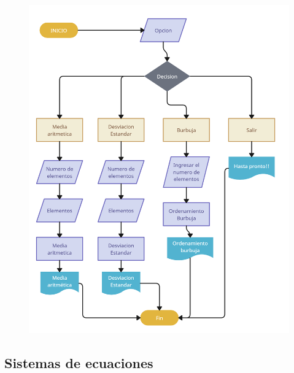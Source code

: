 \documentclass[12pt]{article}
\begin{document}
\begin{figure}[H]
	\begin{center}
 		\includegraphics[width = .8\textwidth]{diagrama.png}
	\end{center} 
\end{figure}
\newpage

\subsection{Sistemas de ecuaciones}
\end{document}
